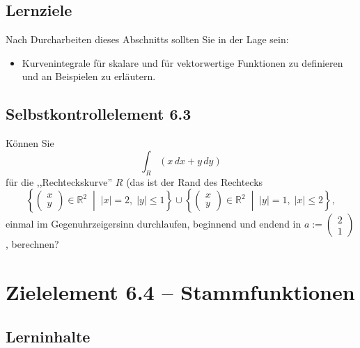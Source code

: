 \documentclass[a4paper,12pt]{article}
\begin{document}
\subsection*{Lernziele}

Nach Durcharbeiten dieses Abschnitts sollten Sie in der Lage sein:
\begin{itemize}
  \item Kurvenintegrale für skalare und für vektorwertige Funktionen zu
        definieren und an Beispielen zu erläutern.
\end{itemize}

\subsection*{Selbstkontrollelement 6.3}

Können Sie
\[
  \int_R (x\,dx + y\,dy)
\]
für die ,,Rechteckskurve'' $R$ (das ist der Rand des Rechtecks
\[
  \left\{\begin{pmatrix}x\\y\end{pmatrix} \in \mathbb{R}^2 \;\middle|\; |x| = 2,\; |y| \leq 1\right\}
  \cup
  \left\{\begin{pmatrix}x\\y\end{pmatrix} \in \mathbb{R}^2 \;\middle|\; |y| = 1,\; |x| \leq 2\right\},
\]
einmal im Gegenuhrzeigersinn durchlaufen, beginnend und endend in
$a := \begin{pmatrix}2 \\ 1\end{pmatrix}$, berechnen?

\newpage

\section*{Zielelement 6.4 -- Stammfunktionen}

\subsection*{Lerninhalte}
\end{document}
